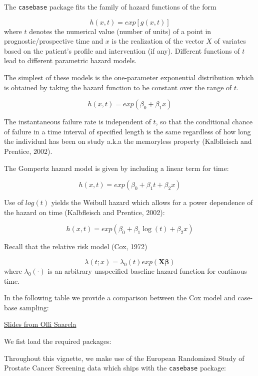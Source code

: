 \documentclass[article]{jss}
\begin{document}
The \texttt{casebase} package fits the family of hazard functions of the
form

\[ h(x,t) = exp[g(x,t)] \] where \(t\) denotes the numerical value
(number of units) of a point in prognostic/prospective time and \(x\) is
the realization of the vector \(X\) of variates based on the patient's
profile and intervention (if any). Different functions of \(t\) lead to
different parametric hazard models.

The simplest of these models is the one-parameter exponential
distribution which is obtained by taking the hazard function to be
constant over the range of \(t\).

\[ h(x,t) = exp(\beta_0 + \beta_1 x) \]

The instantaneous failure rate is independent of \(t\), so that the
conditional chance of failure in a time interval of specified length is
the same regardless of how long the individual has been on study a.k.a
the memoryless property (Kalbfleisch and Prentice, 2002).

The Gompertz hazard model is given by including a linear term for time:

\[ h(x,t)  = exp(\beta_0 + \beta_1 t + \beta_2 x) \]

Use of \(log(t)\) yields the Weibull hazard which allows for a power
dependence of the hazard on time (Kalbfleisch and Prentice, 2002):

\[ h(x, t)  = exp(\beta_0 + \beta_1 \log(t) + \beta_2 x) \]

Recall that the relative risk model (Cox, 1972)

\[ \lambda(t;x) = \lambda_0(t) exp(\mathbf{X}\boldsymbol{\beta})  \]
where \(\lambda_0(\cdot)\) is an arbitrary unspecified baseline hazard
function for continous time.

In the following table we provide a comparison between the Cox model and
case-base sampling:

\href{https://www.fields.utoronto.ca/programs/scientific/14-15/biomarker/slides/saarela.pdf}{Slides
from Olli Saarela}

We fist load the required packages:

Throughout this vignette, we make use of the European Randomized Study
of Prostate Cancer Screening data which ships with the \texttt{casebase}
package:
\end{document}
